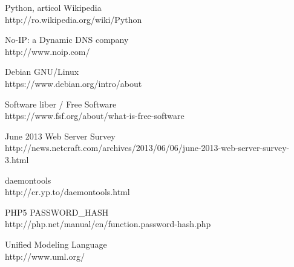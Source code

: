 \documentclass[12pt,a4paper]{article}
\begin{document}
\begin{thebibliography}{99}
	Python, articol Wikipedia\\
	http://ro.wikipedia.org/wiki/Python
	
	No-IP: a Dynamic DNS company \\
	http://www.noip.com/
	
	Debian GNU/Linux \\
	https://www.debian.org/intro/about

	Software liber / Free Software \\
	https://www.fsf.org/about/what-is-free-software
	
	June 2013 Web Server Survey\\
http://news.netcraft.com/archives/2013/06/06/june-2013-web-server-survey-3.html
	
	daemontools\\
	http://cr.yp.to/daemontools.html

	PHP5 PASSWORD\_HASH\\
	http://php.net/manual/en/function.password-hash.php
	
	Unified Modeling Language\\
	http://www.uml.org/
	

\end{thebibliography}
\endgroup
\newpage
\tableofcontents
\end{document}
